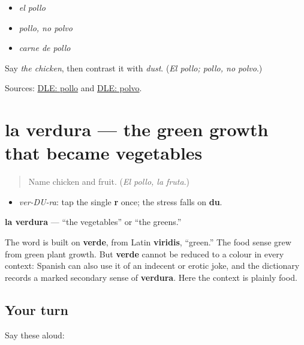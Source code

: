 \begin{itemize}
\raggedright
  \item \emph{el pollo}
  \item \emph{pollo, no polvo}
  \item \emph{carne de pollo}
\end{itemize}

\begin{tcolorbox}[breakable,colback=teal!4,colframe=teal!35!black,title={Before you move on}]
Say \emph{the chicken}, then contrast it with \emph{dust}. (\emph{El pollo; pollo, no polvo}.)

Sources: \href{https://dle.rae.es/pollo}{DLE: pollo} and \href{https://dle.rae.es/polvo}{DLE: polvo}.
\end{tcolorbox}
\section[la verdura]{la verdura — the green growth that became vegetables}

\label{lesson:ES-C403-verdura}



\begin{quote}
Name chicken and fruit. (\emph{El pollo, la fruta}.)
\end{quote}

\begin{sounds}
\begin{itemize}
\raggedright
  \item \emph{ver-DU-ra}: tap the single \textbf{r} once; the stress falls on \textbf{du}.
\end{itemize}
\end{sounds}

\begin{cousinweb}
\textbf{la verdura} — “the vegetables” or “the greens.”

The word is built on \textbf{verde}, from Latin \textbf{viridis}, “green.” The food sense grew from green plant growth. But \textbf{verde} cannot be reduced to a colour in every context: Spanish can also use it of an indecent or erotic joke, and the dictionary records a marked secondary sense of \textbf{verdura}. Here the context is plainly food.
\end{cousinweb}

\subsection*{Your turn}
Say these aloud:

